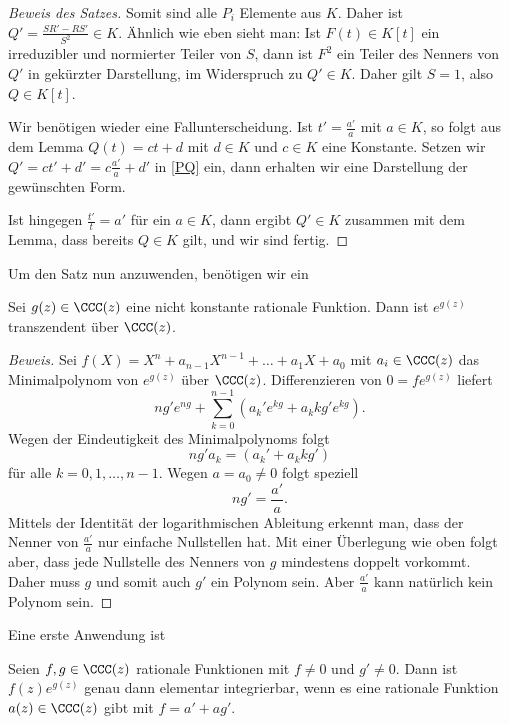 \documentclass[12pt,a4paper,twoside]{article}
\begin{document}
\begin{proof}[Beweis des Satzes]
Somit sind alle $P_i$ Elemente aus $K$. Daher ist $Q'=\frac{SR'-RS'}{S^2}\in
K$. \"Ahnlich wie eben sieht man: Ist $F(t)\in K[t]$ ein irreduzibler und
normierter Teiler von $S$, dann ist $F^2$ ein Teiler des Nenners von $Q'$ in
gek\"urzter Darstellung, im Widerspruch zu $Q'\in K$. Daher gilt $S=1$, also
$Q\in K[t]$.

Wir ben\"otigen wieder eine Fallunterscheidung. Ist $t'=\frac{a'}{a}$ mit
$a\in K$, so folgt aus dem Lemma $Q(t)=ct+d$ mit $d\in K$ und $c\in K$ eine
Konstante. Setzen wir $Q'=ct'+d'=c\frac{a'}{a}+d'$ in \eqref{PQ} ein, dann
erhalten wir eine Darstellung der gew\"unschten Form.

Ist hingegen $\frac{t'}{t}=a'$ f\"ur ein $a\in K$, dann ergibt $Q'\in K$
zusammen mit dem Lemma, dass bereits $Q\in K$ gilt, und wir sind fertig.
\end{proof}
Um den Satz nun anzuwenden, ben\"otigen wir ein
\begin{Lemma}
  Sei $g(z)\in\CCC(z)$ eine nicht konstante rationale Funktion. Dann ist
  $e^{g(z)}$ transzendent \"uber $\CCC(z)$.
\end{Lemma}
\begin{proof}[Beweis]
  Sei $f(X)=X^n+a_{n-1}X^{n-1}+\dots+a_1X+a_0$ mit $a_i\in\CCC(z)$ das
  Minimalpolynom von $e^{g(z)}$ \"uber $\CCC(z)$. Differenzieren von
  $0=fe^{g(z)}$ liefert
\[
ng'e^{ng}+\sum_{k=0}^{n-1}(a_k'e^{kg}+a_kkg'e^{kg}).
\]
Wegen der Eindeutigkeit des Minimalpolynoms folgt
\[
ng'a_k=(a_k'+a_kkg')
\]
f\"ur alle $k=0,1,\dots,n-1$. Wegen $a=a_0\ne0$ folgt speziell
\[
ng'=\frac{a'}{a}.
\]
Mittels der Identit\"at der logarithmischen Ableitung erkennt man, dass der
Nenner von $\frac{a'}{a}$ nur einfache Nullstellen hat. Mit einer \"Uberlegung
wie oben folgt aber, dass jede Nullstelle des Nenners von $g$ mindestens
doppelt vorkommt. Daher muss $g$ und somit auch $g'$ ein Polynom sein. Aber
$\frac{a'}{a}$ kann nat\"urlich kein Polynom sein.
\end{proof}
Eine erste Anwendung ist
\begin{Satz}
  Seien $f,g\in\CCC(z)$ rationale Funktionen mit $f\ne0$ und $g'\ne0$. Dann
  ist $f(z)e^{g(z)}$ genau dann elementar integrierbar, wenn es eine rationale
  Funktion $a(z)\in\CCC(z)$ gibt mit $f=a'+ag'$.
\end{Satz}
\end{document}
